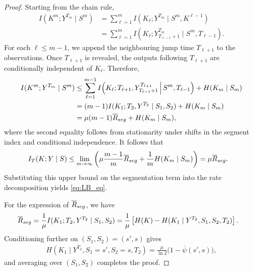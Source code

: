 \documentclass[10pt,a4paper]{amsart}
\begin{document}
\begin{proof}
Starting from the chain rule,
\begin{align*}
    I(K^m;Y^{T_m}\mid S^m)
    &= \sum_{\ell=1}^m
    I(K_\ell;Y^{T_m}\mid S^m,K^{\ell-1}) \\
    &= \sum_{\ell=1}^m
    I(K_\ell;Y_{T_{\ell-1}+1}^{T_m}
    \mid S^m,T_{\ell-1}).
\end{align*}
For each $\ell\leq m-1$, we append the neighbouring jump time
$T_{\ell+1}$ to the observations. Once $T_{\ell+1}$ is revealed, the
outputs following $T_{\ell+1}$ are conditionally independent of
$K_\ell$. Therefore,
\begin{align*}
    I(K^m;Y^{T_m}\mid S^m) &\leq
    \sum_{\ell=1}^{m-1}
    I\!\left(
        K_\ell;
        {T_{\ell+1}},Y_{T_{\ell-1}+1}^{T_{\ell+1}}
        \,\middle|\,
        S^m,T_{\ell-1}
    \right) + {H(K_m\mid S_m)} \\
    &=
    (m-1)
    I(K_1;{T_2},Y^{T_2}\mid S_1,S_2)
    +{H(K_m\mid S_m)} \\
    &=
    \mu(m-1)\overline{R}_{\rm seg}
    +{H(K_m\mid S_m)},
\end{align*}
where the second equality follows from stationarity under shifts in the
segment index and conditional independence. It follows that
\begin{align*}
    I_T(K;Y\mid S)
    &\leq
    \lim_{m\rightarrow\infty}
    \left(
        \mu\frac{m-1}{m}\overline{R}_{\rm seg}
        +{\frac{1}{m}H(K_m\mid S_m)}
    \right) =\mu\overline{R}_{\rm seg}.
\end{align*}
Substituting this upper bound on the segmentation term into the rate
decomposition yields \eqref{eq:LB_eq}.

For the expression of $\overline{R}_{\rm seg}$, we have
\begin{align*}
    \overline{R}_{\rm seg}
    &=
    \frac{1}{\mu}
    I(K_1;T_2,Y^{T_2}\mid S_1,S_2) =
    \frac{1}{\mu}
    \left[
        H(K)
        -H(K_1\mid Y^{T_2},S_1,S_2,T_2)
    \right].
\end{align*}
Conditioning further on $(S_1,S_2)=(s',s)$ gives
\begin{align}
    H(K_1\mid Y^{T_2},S_1=s',S_2=s,T_2)
    =
    \frac{\mu}{\ln 2}
    \bigl(1-\overline{\psi}(s',s)\bigr),\label{eq:two-segment-ent}
\end{align}
and averaging over $(S_1,S_2)$ completes the proof.
\end{proof}
\end{document}
